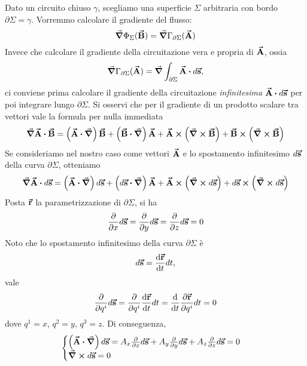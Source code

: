Dato un circuito chiuso $\gamma$, scegliamo una superficie $\Sigma$ arbitraria con bordo $\partial \Sigma=\gamma$. Vorremmo calcolare il gradiente del flusso:
\begin{equation*}
	\grad{\Phi_\Sigma(\vb*{\va{B}})}=\grad{\Gamma_{\partial\Sigma}(\vb*{\va{A}})}
\end{equation*}
Invece che calcolare il gradiente della circuitazione vera e propria di $\vb*{\va{A}}$, ossia
\begin{equation}
	\grad{\Gamma_{\partial\Sigma}(\vba{A})}=\grad{\int_{\partial\Sigma}\vba{A}\vdot d\vba{s}},
\end{equation}
ci conviene prima calcolare il gradiente della circuitazione \textit{infinitesima} $\vba{A}\vdot d\vba{s}$ per poi integrare lungo $\partial\Sigma$.
Si osservi che per il gradiente di un prodotto scalare tra vettori vale la formula per nulla immediata
\begin{equation}
	\grad{\vba{A}\vdot\vba{B}}=\left(\vba{A}\vdot\grad\right)\vba{B}+\left(\vba{B}\vdot\grad\right)\vba{A}+\vba{A}\cross\left(\grad\cross\vba{B}\right)+\vba{B}\cross\left(\grad\cross\vba{B}\right)
\end{equation}
Se consideriamo nel nostro caso come vettori $\vb*{\va{A}}$ e lo spostamento infinitesimo $d\vb*{\va{s}}$ della curva $\partial \Sigma$, otteniamo
\begin{equation*}
	\grad{\vba{A}\vdot d\vba{s}}=\left(\vba{A}\vdot\grad\right)d\vba{s}+\left(d\vba{s}\vdot\grad\right)\vba{A}+\vba{A}\cross\left(\grad\cross d\vba{s}\right)+d\vba{s}\cross\left(\grad\cross d\vba{s}\right)
\end{equation*}
Posta $\vb*{\va{r}}$ la parametrizzazione di $\partial \Sigma$, si ha
	\begin{equation*}
		\pdv{x} d\vb*{\va{s}}=
		\pdv{y} d\vb*{\va{s}}=
		\pdv{z} d\vb*{\va{s}}=0
		\end{equation*} %
Noto che lo spostamento infinitesimo della curva $\partial \Sigma$ è
	\begin{equation*}
		d\vb*{\va{s}}=\dv{\vb*{\va{r}}}{t}dt,
	\end{equation*}
	vale
	\begin{equation*}
		\pdv{q^i} d\vb*{\va{s}}=
		\pdv{q^i} \dv{\vb*{\va{r}}}{t}dt=
		\dv{t} \pdv{\vb*{\va{r}}}{q^i}dt=0
	\end{equation*}
dove $q^1=x$, $q^2=y$, $q^3=z$.
Di conseguenza,
\begin{equation*}
\begin{cases}
	\left(\vba{A}\vdot\grad\right)d\vba{s}=A_x\pdv{x} d\vba{s}+A_y\pdv{y} d\vba{s}+A_z\pdv{z} d\vba{s}=0\\
	\curl{d\vba{s}}=0
\end{cases}
\end{equation*} %
